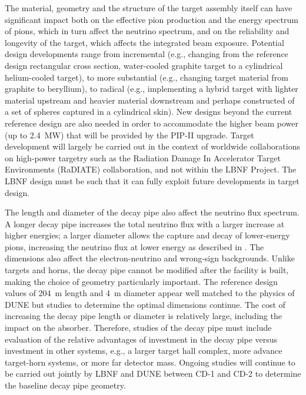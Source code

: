 The material, geometry and the structure of the target assembly itself can have significant impact both on the effective pion production and the energy spectrum of pions, which in turn affect the neutrino spectrum, and on the reliability and longevity of 
the target, which affects the integrated beam exposure.  Potential design developments range from incremental (e.g., changing from the reference design rectangular cross section, water-cooled graphite target to a cylindrical 
helium-cooled target), to more substantial (e.g., changing target material from graphite to beryllium), to radical (e.g., implementing a hybrid target with lighter material upstream and heavier material downstream and perhaps constructed of a set of spheres captured in a 
cylindrical skin).  New designs beyond the current reference design are also needed in order to accommodate the higher beam power (up to 2.4~MW) that will be provided by the PIP-II upgrade.  Target development will largely be carried out in the 
context of worldwide collaborations on high-power targetry such as the Radiation Damage In Accelerator Target 
Environments (RaDIATE) collaboration, and not within the LBNF Project. The LBNF design must be such that it can fully exploit future developments in target design.
 
The length and diameter of the decay pipe also affect the neutrino flux spectrum.  A longer decay pipe increases the total neutrino flux with a larger increase at higher energies; a larger diameter allows the capture and decay of lower-energy pions, 
increasing the neutrino flux at lower energy as described in \volphys. The dimensions also affect the electron-neutrino and wrong-sign backgrounds.  Unlike targets and horns, the decay pipe cannot be modified after the facility is built, making the 
choice of geometry particularly important.  The reference design values of \SI{204}{\meter} length and \SI{4}{\meter} diameter appear well matched to the physics of DUNE but studies to determine the optimal dimensions continue.  The cost of increasing the decay 
pipe length or diameter  is relatively large, including 
the impact on the absorber.
Therefore, studies of the decay pipe must include 
evaluation of the relative advantages of
investment in the decay pipe versus investment in 
other systems, e.g., a larger target hall complex, more advance target-horn systems, or more far detector mass.  Ongoing studies will continue to be carried out jointly by LBNF and DUNE between CD-1 and CD-2 to determine the baseline decay pipe geometry.


